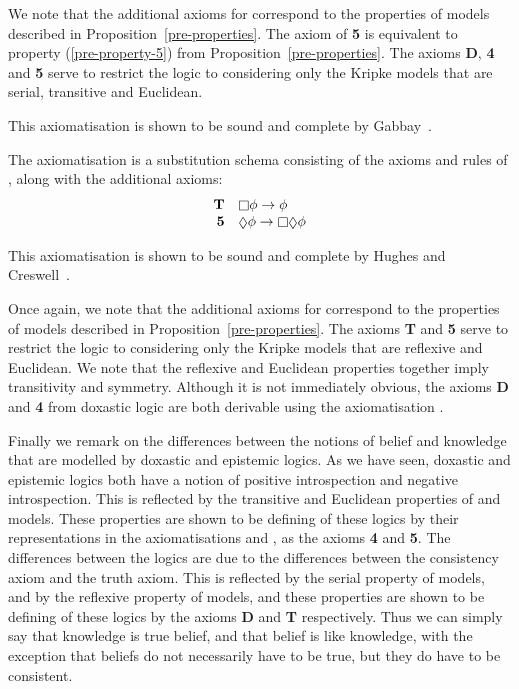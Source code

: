 We note that the additional axioms for \axiomKD{} correspond to the properties
of \classKD{} models described in Proposition~\ref{pre-properties}. The axiom of
{\bf 5} is equivalent to property (\ref{pre-property-5}) from
Proposition~\ref{pre-properties}. The axioms {\bf D}, {\bf 4} and {\bf 5} serve
to restrict the logic to considering only the Kripke models that are serial,
transitive and Euclidean.

This axiomatisation is shown to be sound and complete by
Gabbay~\cite{gabbay2003many}.

\begin{definition}
The axiomatisation \axiomS{} is a substitution schema consisting of the axioms
and rules of \axiomK{}, along with the additional axioms:
$$
\begin{array}{rl}
{\bf T} & \knows \phi \implies \phi\\
{\bf 5} & \suspects \phi \implies \knows \suspects \phi\\
\end{array}
$$
\end{definition}

This axiomatisation is shown to be sound and complete by Hughes and
Creswell~\cite{hughes1996new}.

Once again, we note that the additional axioms for \axiomS{} correspond to the
properties of \classS{} models described in Proposition~\ref{pre-properties}.
The axioms {\bf T} and {\bf 5} serve to restrict the logic to considering only
the Kripke models that are reflexive and Euclidean.  We note that the reflexive
and Euclidean properties together imply transitivity and symmetry. Although it
is not immediately obvious, the axioms {\bf D} and {\bf 4} from doxastic logic
are both derivable using the axiomatisation \axiomS{}.

Finally we remark on the differences between the notions of belief and knowledge
that are modelled by doxastic and epistemic logics. As we have seen, doxastic
and epistemic logics both have a notion of positive introspection and negative
introspection. This is reflected by the transitive and Euclidean properties of
\classKD{} and \classS{} models. These properties are shown to be defining of
these logics by their representations in the axiomatisations \axiomKD{} and
\axiomS{}, as the axioms {\bf 4} and {\bf 5}. The differences between the logics
are due to the differences between the consistency axiom and the truth axiom.
This is reflected by the serial property of \classKD{} models, and by the
reflexive property of \classS{} models, and these properties are shown to be
defining of these logics by the axioms {\bf D} and {\bf T} respectively. Thus we
can simply say that knowledge is true belief, and that belief is like knowledge,
with the exception that beliefs do not necessarily have to be true, but they do
have to be consistent.
